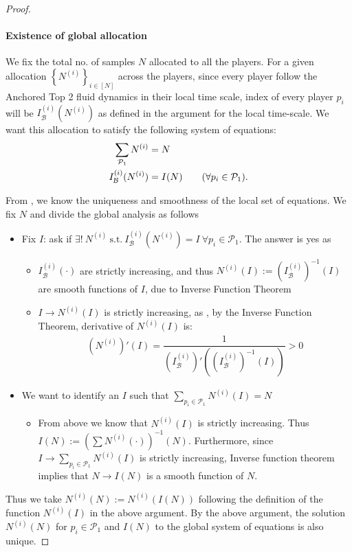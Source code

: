 \documentclass{article}
\begin{document}
\begin{proof}
    
    \paragraph{Existence of global allocation} We fix the total no. of samples $N$ allocated to all the players. For a given allocation $\left\{N^{(i)}\right\}_{i\in [N]}$ across the players, since every player follow the Anchored Top 2 fluid dynamics in their local time scale, index of every player $p_i$ will be $I^{(i)}_{\mathcal{B}}(N^{(i)})$ as defined in the argument for the local time-scale. We want this allocation to satisfy the following system of equations: 
    \begin{align*}
        \sum_{\mathcal{P}_1}N^{(i)} &= N\\
        I^{(i)}_{\mathcal{B}}(N^{(i)}) &= I(N)\tag{$\forall p_i\in\mathcal{P}_{1}$}.
    \end{align*}

    From \cite{bandyopadhyay2024optimal}, we know the uniqueness and smoothness of the local set of equations. We fix $N$ and divide the global analysis as follows 
    \begin{itemize}
        \item Fix $I$: ask if $\exists!\ N^{(i)} \ \text{s.t.}\ I^{(i)}_{\mathcal{B}}(N^{(i)})=I\ \forall p_i\in\mathcal{P}_1$. The answer is yes as
        \begin{itemize}
            \item $I^{(i)}_{\mathcal{B}}(\cdot )$ are strictly increasing, and thus $N^{(i)}(I):=\left(I^{(i)}_{\mathcal{B}}\right)^{-1}(I)$  are smooth functions of $I$, due to Inverse Function Theorem
            \item $I\to N^{(i)}(I)$ is strictly increasing, as , by the Inverse Function Theorem, derivative of $N^{(i)}(I)$ is:
            \begin{align*}
                \left(N^{(i)}\right)'(I) = \dfrac{1}{\left(I^{(i)}_{\mathcal{B}}\right)'\left(\left(I^{(i)}_{\mathcal{B}}\right)^{-1}(I)\right)}>0
            \end{align*}
        \end{itemize}
        \item We want to identify an $I$ such that $\sum_{p_i\in\mathcal{P}_1}N^{(i)}(I)=N$
        \begin{itemize}
            \item From above we know that $N^{(i)}(I)$ is strictly increasing. Thus $I(N) := \left(\sum N^{(i)}(\cdot)\right)^{-1}(N)$. Furthermore, since $I\to \sum_{p_i\in\mathcal{P}_1}N^{(i)}(I)$ is strictly increasing, Inverse function theorem implies that $N\to I(N)$ is a smooth function of $N$.  
        \end{itemize}
    \end{itemize}
    Thus we take $N^{(i)}(N):=N^{(i)}(I(N))$ following the definition of the function $N^{(i)}(I)$ in the above argument. By the above argument, the solution $N^{(i)}(N)$ for $p_i\in\mathcal{P}_1$ and $I(N)$ to the global system of equations is also unique. 
\end{proof}
\end{document}
